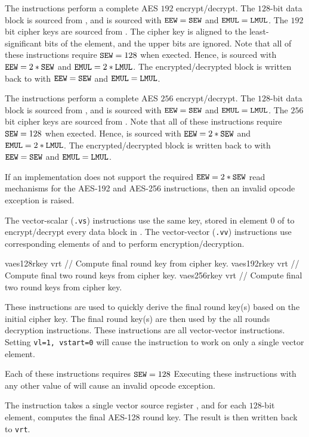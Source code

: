 The  instructions perform a complete
AES $192$ encrypt/decrypt.
The $128$-bit data block is sourced from \vrt, and is sourced with
${\tt EEW}={\tt SEW}$ and ${\tt EMUL}={\tt LMUL}$.
The $192$ bit cipher keys are sourced from .
The cipher key is aligned to the least-significant
bits of the element, and the upper bits are ignored.
Note that all of these instructions require ${\tt SEW}=128$ when exected.
Hence,  is sourced with ${\tt EEW}=2*{\tt SEW}$ and ${\tt EMUL}=2*{\tt LMUL}$.
The encrypted/decrypted block is written back to \vrt with
${\tt EEW}={\tt SEW}$ and ${\tt EMUL}={\tt LMUL}$.

The  instructions perform a complete
AES $256$ encrypt/decrypt.
The $128$-bit data block is sourced from \vrt, and is sourced with
${\tt EEW}={\tt SEW}$ and ${\tt EMUL}={\tt LMUL}$.
The $256$ bit cipher keys are sourced from .
Note that all of these instructions require ${\tt SEW}=128$ when exected.
Hence,  is sourced with ${\tt EEW}=2*{\tt SEW}$ and ${\tt EMUL}=2*{\tt LMUL}$.
The encrypted/decrypted block is written back to \vrt with
${\tt EEW}={\tt SEW}$ and ${\tt EMUL}={\tt LMUL}$.

If an implementation does not support the required ${\tt EEW}=2*{\tt SEW}$
read mechanisms for the AES-192 and AES-256 instructions, then an invalid
opcode exception is raised.

The vector-scalar ({\tt *.vs}) instructions use the same key, stored
in element $0$ of  to encrypt/decrypt every data block in \vrt.
The vector-vector ({\tt *.vv}) instructions use corresponding elements
of  and \vrt to perform encryption/decryption.

\begin{cryptoisa}
vaes128rkey vrt    // Compute final round key from cipher key.
vaes192rkey vrt    // Compute final two round keys from cipher key.
vaes256rkey vrt    // Compute final two round keys from cipher key.
\end{cryptoisa}

These instructions are used to quickly derive the final round key(s)
based on the initial cipher key.
The final round key(s) are then used by the all rounds decryption
instructions.
These instructions are all vector-vector instructions.
Setting {\tt vl=1, vstart=0} will cause the instruction to work on only a
single vector element.

Each of these instructions requires ${\tt SEW}=128$
Executing these instructions with any other value of \SEW will cause
an invalid opcode exception.

The  instruction takes a single
vector source register \vrt, and for each $128$-bit element, computes
the final AES-128 round key.
The result is then written back to {\tt vrt}.

